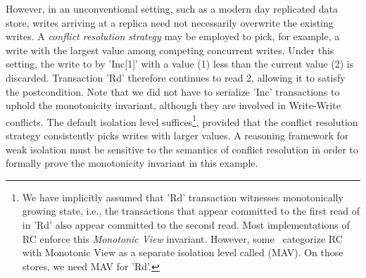 However, in an unconventional setting, such as a modern day replicated
data store, writes arriving at a replica need not necessarily
overwrite the existing writes. A \emph{conflict resolution strategy}
may be employed to pick, for example, a write with the largest value
among competing concurrent writes. Under this setting, the write to
 by 'Inc[1]' with a value (1) less than the current value (2) is
discarded. Transaction 'Rd' therefore continues to read 2, allowing it
to satisfy the postcondition. Note that we did not have to serialize
'Inc' transactions to uphold the monotonicity invariant, although they
are involved in Write-Write conflicts.  The default  isolation level suffices\footnote{We have implicitly assumed that
'Rd' transaction witnesses monotonically growing state, i.e., the
transactions that appear committed to the first read of  in 'Rd'
also appear committed to the second read.  Most implementations of RC
enforce this \emph{Monotonic View} invariant. However,
some~\cite{pldi15,bailishat} categorize RC with Monotonic View as a
separate isolation level called  (MAV). On
those stores, we need MAV for 'Rd'. }, provided that the conflict
resolution strategy consistently picks writes with larger values. A
reasoning framework for weak isolation must be sensitive to the
semantics of conflict resolution in order to formally prove the
monotonicity invariant in this example.


